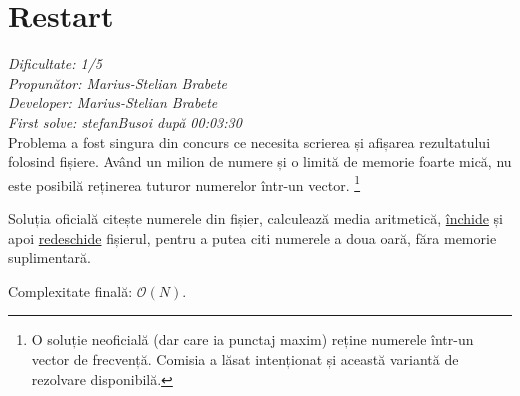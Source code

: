 \section{Restart}
\textit{Dificultate: 1/5} \\
\textit{Propunător: Marius-Stelian Brabete} \\
\textit{Developer: Marius-Stelian Brabete} \\
\textit{First solve: stefanBusoi după 00:03:30}  \\

Problema a fost singura din concurs ce necesita scrierea și afișarea rezultatului folosind fișiere. Având un milion de numere și o limită de memorie foarte mică, nu este posibilă reținerea tuturor numerelor într-un vector.%
\footnote{O soluție neoficială (dar care ia punctaj maxim) reține numerele într-un vector de frecvență. Comisia a lăsat intenționat și această variantă de rezolvare disponibilă.}

Soluția oficială citește numerele din fișier, calculează media aritmetică, \href{https://cplusplus.com/reference/fstream/fstream/close/}{închide} și apoi \href{https://cplusplus.com/reference/fstream/fstream/open/}{redeschide} fișierul, pentru a putea citi numerele a doua oară, făra memorie suplimentară.

\medskip

Complexitate finală: $\mathcal{O}(N)$.
